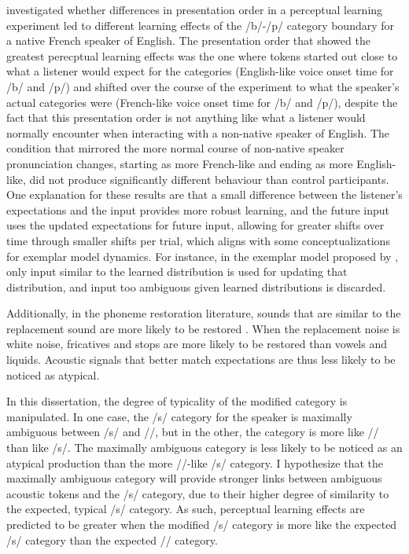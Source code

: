 %
\citet{Sumner2011} investigated whether differences in presentation order in a perceptual learning experiment led to different learning effects of the /b/-/p/ category boundary for a native French speaker of English.  
The presentation order that showed the greatest perecptual learning effects was the one where tokens started out close to what a listener would expect for the categories (English-like voice onset time for /b/ and /p/) and shifted over the course of the experiment to what the speaker's actual categories were (French-like voice onset time for /b/ and /p/), despite the fact that this presentation order is not anything like what a listener would normally encounter when interacting with a non-native speaker of English.  
The condition that mirrored the more normal course of non-native speaker pronunciation changes, starting as more French-like and ending as more English-like, did not produce significantly different behaviour than control participants.  
One explanation for these results are that a small difference between the listener's expectations and the input provides more robust learning, and the future input uses the updated expectations for future input, allowing for greater shifts over time through smaller shifts per trial, which aligns with some conceptualizations for exemplar model dynamics.
For instance, in the exemplar model proposed by \citet{Pierrehumbert2001}, only input similar to the learned distribution is used for updating that distribution, and input too ambiguous given learned distributions is discarded.

Additionally, in the phoneme restoration literature, sounds that are similar to the replacement sound are more likely to be restored \citep{Samuel1981}.  
When the replacement noise is white noise, fricatives and stops are more likely to be restored than vowels and liquids.
Acoustic signals that better match expectations are thus less likely to be noticed as atypical.

In this dissertation, the degree of typicality of the modified category is manipulated.  
In one case, the /s/ category for the speaker is maximally ambiguous between /s/ and /\textesh/, but in the other, the category is more like /\textesh/ than like /s/.
The maximally ambiguous category is less likely to be noticed as an atypical production than the more /\textesh/-like /s/ category.
I hypothesize that the maximally ambiguous category will provide stronger links between ambiguous acoustic tokens and the /s/ category, due to their higher degree of similarity to the expected, typical /s/ category.
As such, perceptual learning effects are predicted to be greater when the modified /s/ category is more like the expected /s/ category than the expected /\textesh/ category.

